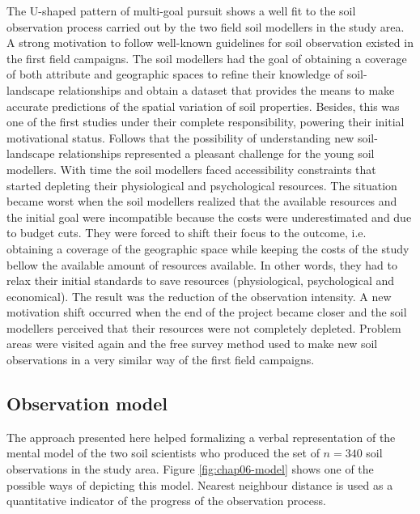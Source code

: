 The U-shaped pattern of multi-goal pursuit shows a well fit to the soil observation process carried out by the 
two field soil modellers in the study area. A strong motivation to follow well-known guidelines for soil 
observation existed in the first field campaigns. The soil modellers had the goal of obtaining a coverage of 
both attribute and geographic spaces to refine their knowledge of soil-landscape relationships and obtain a 
dataset that provides the means to make accurate predictions of the spatial variation of soil properties. 
Besides, this was one of the first studies under their complete responsibility, powering their initial 
motivational status. Follows that the possibility of understanding new soil-landscape relationships represented
a pleasant challenge for the young soil modellers. With time the soil modellers faced accessibility 
constraints that started depleting their physiological and psychological resources. The situation became worst 
when the soil modellers realized that the available resources and the initial goal were incompatible because 
the costs were underestimated and due to budget cuts. They were forced to shift their focus to the outcome, 
i.e. obtaining a  coverage of the geographic space while keeping the costs of the study 
bellow the available amount of resources available. In other words, they had to relax their initial standards 
to save resources (physiological, psychological and economical). The result was the reduction of the 
observation intensity. A new motivation shift occurred when the end of the project became closer and the soil 
modellers perceived that their resources were not completely depleted. Problem areas were visited again and the 
free survey method used to make new soil observations in a very similar way of the first field campaigns.

\subsection{Observation model}

The approach presented here helped formalizing a verbal representation of the mental model of the two soil 
scientists who produced the set of $n = 340$ soil observations in the study area. Figure 
\ref{fig:chap06-model} shows one of the possible ways of depicting this model. Nearest neighbour distance is 
used as a quantitative indicator of the progress of the observation process.

